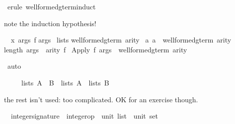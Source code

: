 \begin{isabellebody}
\ {\isacharparenleft}erule\ well{\isacharunderscore}formed{\isacharunderscore}gterm{\isacharprime}{\isachardot}induct{\isacharparenright}%
\begin{isamarkuptxt}%
note the induction hypothesis!
\begin{isabelle}%
\ {}{\isachardot}\ {\isasymAnd}x\ args\ f{\isachardot}\isanewline
{}args\isanewline
{}\ lists\isanewline
{}well{\isacharunderscore}formed{\isacharunderscore}gterm{\isacharprime}\ arity\ {\isasyminter}\isanewline
{}a{\isachardot}\ a\ {\isasymin}\ well{\isacharunderscore}formed{\isacharunderscore}gterm\ arity{\isacharbraceright}{\isacharparenright}{\isacharsemicolon}\isanewline
{}length\ args\ {\isacharequal}\ arity\ f{\isasymrbrakk}\isanewline
{}\ Apply\ f\ args\ {\isasymin}\ well{\isacharunderscore}formed{\isacharunderscore}gterm\ arity%
\end{isabelle}%
\end{isamarkuptxt}%
\isamarkuptrue%
\isamarkupfalse%
\ auto\isanewline
{}\isamarkupfalse%
%
\endisatagproof
{\isafoldproof}%
%
\isadelimproof
%
\endisadelimproof
%
\begin{isamarkuptext}%
\begin{isabelle}%
\ \ \ \ \ lists\ {\isacharparenleft}A\ {\isasyminter}\ B{\isacharparenright}\ {\isacharequal}\ lists\ A\ {\isasyminter}\ lists\ B%
\end{isabelle}%
\end{isamarkuptext}%
\isamarkuptrue%
%
\begin{isamarkuptext}%
the rest isn't used: too complicated.  OK for an exercise though.%
\end{isamarkuptext}%
\isamarkuptrue%
\isamarkupfalse%
\isanewline
\ \ integer{\isacharunderscore}signature\ {\isacharcolon}{\isacharcolon}\ {\isachardoublequoteopen}{\isacharparenleft}integer{\isacharunderscore}op\ {\isacharasterisk}\ {\isacharparenleft}unit\ list\ {\isacharasterisk}\ unit{\isacharparenright}{\isacharparenright}\ set{\isachardoublequoteclose}\isanewline
{}\isanewline

\end{isabellebody}
